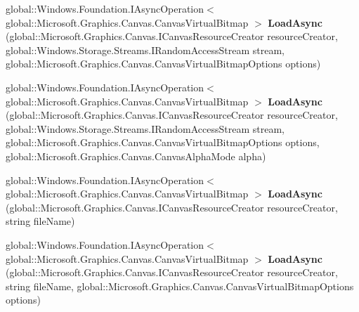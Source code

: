 \begin{DoxyCompactItemize}
\item 
\mbox{\label{interface_microsoft_1_1_graphics_1_1_canvas_1_1_i_canvas_virtual_bitmap_statics_afcb7bb816ebb415ed059fda157c6bdca}} 
global\+::\+Windows.\+Foundation.\+I\+Async\+Operation$<$ global\+::\+Microsoft.\+Graphics.\+Canvas.\+Canvas\+Virtual\+Bitmap $>$ {\bfseries Load\+Async} (global\+::\+Microsoft.\+Graphics.\+Canvas.\+I\+Canvas\+Resource\+Creator resource\+Creator, global\+::\+Windows.\+Storage.\+Streams.\+I\+Random\+Access\+Stream stream, global\+::\+Microsoft.\+Graphics.\+Canvas.\+Canvas\+Virtual\+Bitmap\+Options options)
\item 
\mbox{\label{interface_microsoft_1_1_graphics_1_1_canvas_1_1_i_canvas_virtual_bitmap_statics_a60b2049c357c42be3e7dbccef1e43260}} 
global\+::\+Windows.\+Foundation.\+I\+Async\+Operation$<$ global\+::\+Microsoft.\+Graphics.\+Canvas.\+Canvas\+Virtual\+Bitmap $>$ {\bfseries Load\+Async} (global\+::\+Microsoft.\+Graphics.\+Canvas.\+I\+Canvas\+Resource\+Creator resource\+Creator, global\+::\+Windows.\+Storage.\+Streams.\+I\+Random\+Access\+Stream stream, global\+::\+Microsoft.\+Graphics.\+Canvas.\+Canvas\+Virtual\+Bitmap\+Options options, global\+::\+Microsoft.\+Graphics.\+Canvas.\+Canvas\+Alpha\+Mode alpha)
\item 
\mbox{\label{interface_microsoft_1_1_graphics_1_1_canvas_1_1_i_canvas_virtual_bitmap_statics_a330ce31be0bdb0b0a0d703fabfad4773}} 
global\+::\+Windows.\+Foundation.\+I\+Async\+Operation$<$ global\+::\+Microsoft.\+Graphics.\+Canvas.\+Canvas\+Virtual\+Bitmap $>$ {\bfseries Load\+Async} (global\+::\+Microsoft.\+Graphics.\+Canvas.\+I\+Canvas\+Resource\+Creator resource\+Creator, string file\+Name)
\item 
\mbox{\label{interface_microsoft_1_1_graphics_1_1_canvas_1_1_i_canvas_virtual_bitmap_statics_a76a39d531ac6da083f15563d74ccbb82}} 
global\+::\+Windows.\+Foundation.\+I\+Async\+Operation$<$ global\+::\+Microsoft.\+Graphics.\+Canvas.\+Canvas\+Virtual\+Bitmap $>$ {\bfseries Load\+Async} (global\+::\+Microsoft.\+Graphics.\+Canvas.\+I\+Canvas\+Resource\+Creator resource\+Creator, string file\+Name, global\+::\+Microsoft.\+Graphics.\+Canvas.\+Canvas\+Virtual\+Bitmap\+Options options)

\end{DoxyCompactItemize}
